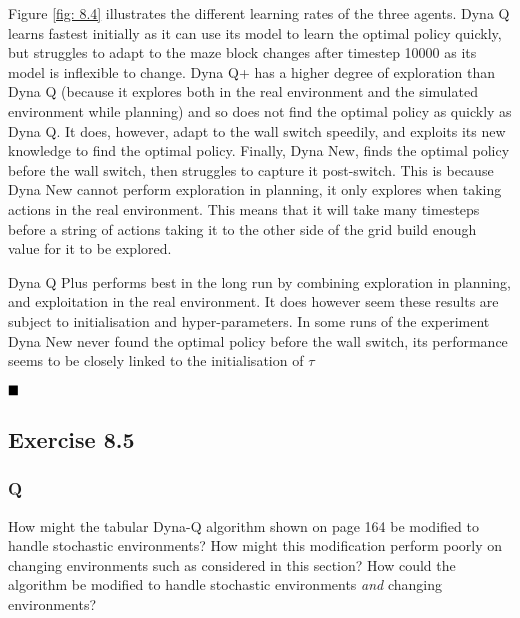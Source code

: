 Figure \ref{fig: 8.4} illustrates the different learning rates of the three agents. Dyna Q learns fastest initially as it can use its model to learn the optimal policy quickly, but struggles to adapt to the maze block changes after timestep 10000 as its model is inflexible to change. Dyna Q+ has a higher degree of exploration than Dyna Q (because it explores both in the real environment and the simulated environment while planning) and so does not find the optimal policy as quickly as Dyna Q. It does, however, adapt to the wall switch speedily, and exploits its new knowledge to find the optimal policy. Finally, Dyna New, finds the optimal policy before the wall switch, then struggles to capture it post-switch. This is because Dyna New cannot perform exploration in planning, it only explores when taking actions in the real environment. This means that it will take many timesteps before a string of actions taking it to the other side of the grid build enough value for it to be explored. 

Dyna Q Plus performs best in the long run by combining exploration in planning, and exploitation in the real environment. It does however seem these results are subject to initialisation and hyper-parameters. In some runs of the experiment Dyna New never found the optimal policy before the wall switch, its performance seems to be closely linked to the initialisation of $\tau$

$
\hfill \blacksquare
$

\subsection{Exercise 8.5}
\subsubsection{Q}
How might the tabular Dyna-Q algorithm shown on page 164 be modified to handle stochastic environments? How might this modification perform poorly on changing environments such as considered in this section? How could the algorithm be modified to handle stochastic environments \textit{and} changing environments?
